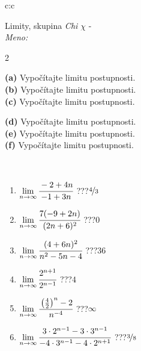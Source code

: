 \documentclass[10pt]{report}
\begin{document}
\newpage
\thispagestyle{empty}
\begin{tabular}{c:c}
\begin{minipage}[c][104.5mm][t]{0.5\linewidth}
\begin{center}
\vspace{5mm}
{\huge Limity, skupina \textit{Chi $\chi$} -}\\[5mm]
\textit{Meno:}\phantom{xxxxxxxxxxxxxxxxxxxxxxxxxxxxxxxxxxxxxxxxxxxxxxxxxxxxxxxxxxxxxxxxx}\\[5mm]
\begin{minipage}{0.95\linewidth}
\begin{center}
{\small \begin{multicols}{2} \raggedright
\textbf{(a)} Vypočítajte limitu postupnosti. \\[1mm]
\textbf{(b)} Vypočítajte limitu postupnosti. \\[1mm]
\textbf{(c)} Vypočítajte limitu postupnosti. \par \columnbreak
\textbf{(d)} Vypočítajte limitu postupnosti. \\[1mm]
\textbf{(e)} Vypočítajte limitu postupnosti. \\[1mm]
\textbf{(f)} Vypočítajte limitu postupnosti.
\end{multicols}
}
\end{center}
\end{minipage}
\\[1mm]
\begin{minipage}{0.79\linewidth}
\begin{center}
\begin{varwidth}{\linewidth}
\setlength{\itemsep}{0pt}
\begin{enumerate}
\footnotesizerr
\item $\lim\limits_{n\to\infty}\cfrac{-2+4n}{-1+3n}$\quad \dotfill\; ???\;\dotfill \quad $\nicefrac{4}{3}$
\item $\lim\limits_{n\to\infty}\cfrac{7(-9+2n)}{(2n+6)^2}$\quad \dotfill\; ???\;\dotfill \quad $0$
\item $\lim\limits_{n\to\infty}\cfrac{(4+6n)^2}{n^2-5n-4}$\quad \dotfill\; ???\;\dotfill \quad $36$
\item $\lim\limits_{n\to\infty}\cfrac{2^{n+1}}{2^{n-1}}$\quad \dotfill\; ???\;\dotfill \quad $4$
\item $\lim\limits_{n\to\infty}\cfrac{\left(\frac{4}{2}\right)^n -2}{n^{-4}}$\quad \dotfill\; ???\;\dotfill \quad $\infty$
\item $\lim\limits_{n\to\infty}\cfrac{3\cdot 2^{n-1}-3\cdot 3^{n-1}}{-4\cdot 3^{n-1}-4\cdot 2^{n+1}}$\quad \dotfill\; ???\;\dotfill \quad $\nicefrac{3}{8}$

\end{enumerate}
\end{varwidth}
\end{center}
\end{minipage}
\end{center}
\end{minipage}
\end{tabular}
\end{document}
